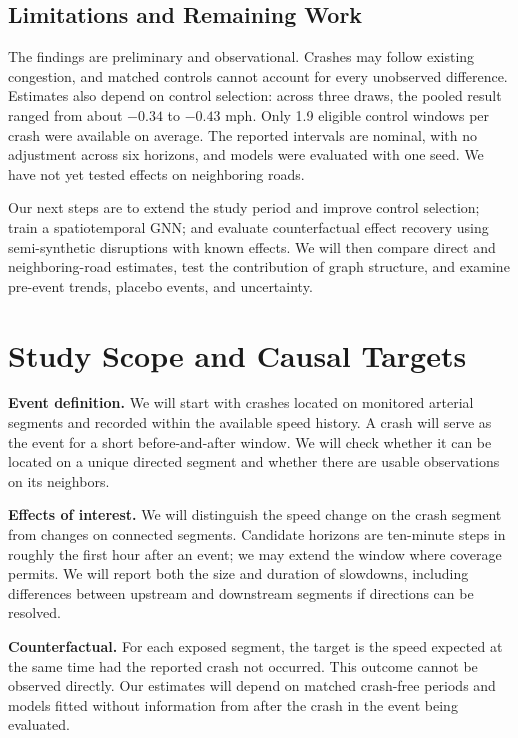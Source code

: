 \documentclass[sigconf,nonacm]{acmart}
\begin{document}
\subsection{{Limitations and Remaining Work}}
{The findings are preliminary and observational.
Crashes may follow existing congestion, and matched controls cannot
account for every unobserved difference. Estimates also depend on
control selection: across three draws, the pooled result ranged from
about $-0.34$ to $-0.43$ mph. Only 1.9 eligible control windows per
crash were available on average. The reported intervals are nominal,
with no adjustment across six horizons, and models were evaluated with
one seed. We have not yet tested effects on neighboring roads.}

{Our next steps are to extend the study period and
improve control selection; train a spatiotemporal GNN; and evaluate
counterfactual effect recovery using semi-synthetic disruptions with
known effects. We will then compare direct and neighboring-road
estimates, test the contribution of graph structure, and examine
pre-event trends, placebo events, and uncertainty.}

\section{Study Scope and Causal Targets}
\textbf{Event definition.} We will start with crashes located on
monitored arterial segments and recorded within the available speed
history. A crash will serve as the event for a short before-and-after
window. We will check whether it can be located on a unique directed
segment and whether there are usable observations on its neighbors.

\textbf{Effects of interest.} We will distinguish the speed change on
the crash segment from changes on connected segments. Candidate
horizons are ten-minute steps in roughly the first hour after an event;
we may extend the window where coverage permits. We will report
both the size and duration of slowdowns, including differences between
upstream and downstream segments if directions can be resolved.

\textbf{Counterfactual.} For each exposed segment, the target is the
speed expected at the same time had the reported crash not occurred.
This outcome cannot be observed directly. Our estimates will depend
on matched crash-free periods and models fitted without information
from after the crash in the event being evaluated.
\end{document}
